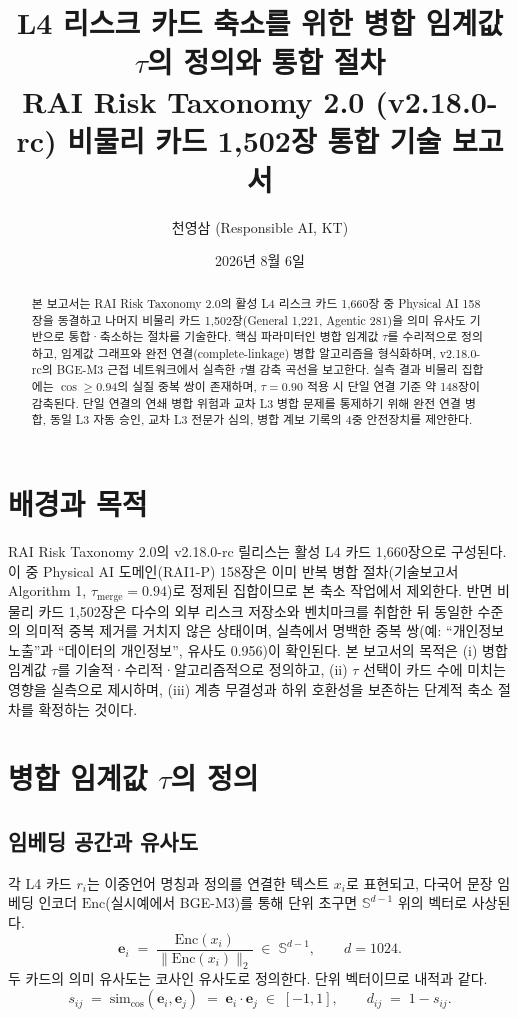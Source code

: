 \documentclass[11pt,a4paper]{article}
\title{\textbf{L4 리스크 카드 축소를 위한 병합 임계값 $\tau$의 정의와 통합 절차}\\[4pt]
\large RAI Risk Taxonomy 2.0 (v2.18.0-rc) 비물리 카드 1{,}502장 통합 기술 보고서}
\author{천영삼 (Responsible AI, KT)}
\date{2026년 8월 6일}
\begin{document}
\maketitle

\begin{abstract}
본 보고서는 RAI Risk Taxonomy 2.0의 활성 L4 리스크 카드 1{,}660장 중 Physical AI 158장을 동결하고 나머지 비물리 카드 1{,}502장(General 1{,}221, Agentic 281)을 의미 유사도 기반으로 통합·축소하는 절차를 기술한다. 핵심 파라미터인 병합 임계값 $\tau$를 수리적으로 정의하고, 임계값 그래프와 완전 연결(complete-linkage) 병합 알고리즘을 형식화하며, v2.18.0-rc의 BGE-M3 근접 네트워크에서 실측한 $\tau$별 감축 곡선을 보고한다. 실측 결과 비물리 집합에는 $\cos \geq 0.94$의 실질 중복 쌍이 존재하며, $\tau = 0.90$ 적용 시 단일 연결 기준 약 148장이 감축된다. 단일 연결의 연쇄 병합 위험과 교차 L3 병합 문제를 통제하기 위해 완전 연결 병합, 동일 L3 자동 승인, 교차 L3 전문가 심의, 병합 계보 기록의 4중 안전장치를 제안한다.
\end{abstract}

\section{배경과 목적}

RAI Risk Taxonomy 2.0의 v2.18.0-rc 릴리스는 활성 L4 카드 1{,}660장으로 구성된다. 이 중 Physical AI 도메인(RAI1-P) 158장은 이미 반복 병합 절차(기술보고서 Algorithm 1, $\tau_{\mathrm{merge}}=0.94$)로 정제된 집합이므로 본 축소 작업에서 제외한다. 반면 비물리 카드 1{,}502장은 다수의 외부 리스크 저장소와 벤치마크를 취합한 뒤 동일한 수준의 의미적 중복 제거를 거치지 않은 상태이며, 실측에서 명백한 중복 쌍(예: ``개인정보 노출''과 ``데이터의 개인정보'', 유사도 0.956)이 확인된다. 본 보고서의 목적은 (i) 병합 임계값 $\tau$를 기술적·수리적·알고리즘적으로 정의하고, (ii) $\tau$ 선택이 카드 수에 미치는 영향을 실측으로 제시하며, (iii) 계층 무결성과 하위 호환성을 보존하는 단계적 축소 절차를 확정하는 것이다.

\section{병합 임계값 $\tau$의 정의}

\subsection{임베딩 공간과 유사도}

각 L4 카드 $r_i$는 이중언어 명칭과 정의를 연결한 텍스트 $x_i$로 표현되고, 다국어 문장 임베딩 인코더 $\mathrm{Enc}$(실시예에서 BGE-M3)를 통해 단위 초구면 $\mathbb{S}^{d-1}$ 위의 벡터로 사상된다.
\begin{equation}
\mathbf{e}_i \;=\; \frac{\mathrm{Enc}(x_i)}{\lVert \mathrm{Enc}(x_i) \rVert_2} \;\in\; \mathbb{S}^{d-1}, \qquad d=1024.
\end{equation}
두 카드의 의미 유사도는 코사인 유사도로 정의한다. 단위 벡터이므로 내적과 같다.
\begin{equation}
s_{ij} \;=\; \mathrm{sim}_{\cos}(\mathbf{e}_i,\mathbf{e}_j) \;=\; \mathbf{e}_i \cdot \mathbf{e}_j \;\in\; [-1,1],
\qquad
d_{ij} \;=\; 1 - s_{ij}.
\end{equation}
\end{document}
